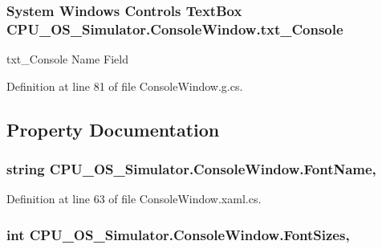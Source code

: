 \subsubsection[{txt\+\_\+\+Console}]{\setlength{\rightskip}{0pt plus 5cm}System Windows Controls Text\+Box C\+P\+U\+\_\+\+O\+S\+\_\+\+Simulator.\+Console\+Window.\+txt\+\_\+\+Console}\label{class_c_p_u___o_s___simulator_1_1_console_window_ad1d4a0c5f573c7e89c8d6ed57d5097e0}


txt\+\_\+\+Console Name Field 



Definition at line 81 of file Console\+Window.\+g.\+cs.



\subsection{Property Documentation}
\hypertarget{class_c_p_u___o_s___simulator_1_1_console_window_a752c6bed63b2368b26a4287a2902ef61}{}
\subsubsection[{Font\+Name}]{\setlength{\rightskip}{0pt plus 5cm}string C\+P\+U\+\_\+\+O\+S\+\_\+\+Simulator.\+Console\+Window.\+Font\+Name\hspace{0.3cm}{\ttfamily [get]}, {\ttfamily [set]}}\label{class_c_p_u___o_s___simulator_1_1_console_window_a752c6bed63b2368b26a4287a2902ef61}


Definition at line 63 of file Console\+Window.\+xaml.\+cs.

\hypertarget{class_c_p_u___o_s___simulator_1_1_console_window_a3f0174de74f8505bc6880ec7a67cd61f}{}
\subsubsection[{Font\+Sizes}]{\setlength{\rightskip}{0pt plus 5cm}int C\+P\+U\+\_\+\+O\+S\+\_\+\+Simulator.\+Console\+Window.\+Font\+Sizes\hspace{0.3cm}{\ttfamily [get]}, {\ttfamily [set]}}\label{class_c_p_u___o_s___simulator_1_1_console_window_a3f0174de74f8505bc6880ec7a67cd61f}



